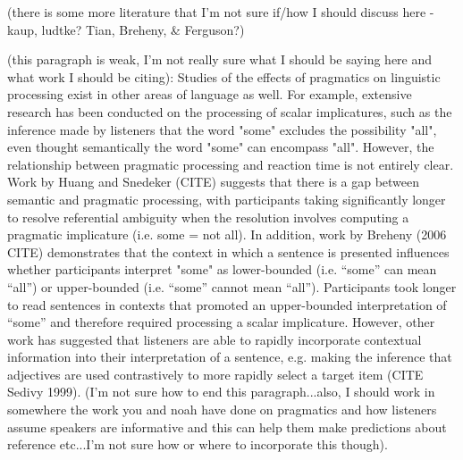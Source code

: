 \documentclass[man]{apa2}
\begin{document}
(there is some more literature that I'm not sure if/how I should discuss here - kaup, ludtke?  Tian, Breheny, & Ferguson?)

(this paragraph is weak, I'm not really sure what I should be saying here and what work I should be citing): Studies of the effects of pragmatics on linguistic processing exist in other areas of language as well.  For example, extensive research has been conducted on the processing of scalar implicatures, such as the inference made by listeners that the word "some" excludes the possibility "all", even thought semantically the word "some" can encompass "all".  However, the relationship between pragmatic processing and reaction time is not entirely clear.  Work by Huang and Snedeker (CITE) suggests that there is a gap between semantic and pragmatic processing, with participants taking significantly longer to resolve referential ambiguity when the resolution involves computing a pragmatic implicature (i.e. some = not all).  In addition, work by Breheny (2006 CITE) demonstrates that the context in which a sentence is presented influences whether participants interpret "some" as lower-bounded (i.e. ``some'' can mean ``all'') or upper-bounded (i.e.  ``some'' cannot mean ``all'').  Participants took longer to read sentences in contexts that promoted an upper-bounded interpretation of ``some'' and therefore required processing a scalar implicature.  However, other work has suggested that  listeners are able to rapidly incorporate contextual information into their interpretation of a sentence, e.g. making the inference that 
adjectives are used contrastively to more rapidly select a target item (CITE Sedivy 1999).  (I'm not sure how to end this paragraph...also, I should work in somewhere the work you and noah have done on pragmatics and how listeners assume speakers are informative and this can help them make predictions about reference etc...I'm not sure how or where to incorporate this though).  
\end{document}
